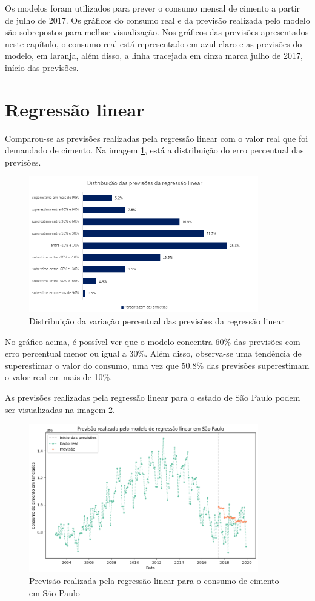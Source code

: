 Os modelos foram utilizados para prever o consumo mensal de 
cimento a partir de julho de 2017. Os gráficos do consumo real 
e da previsão realizada pelo modelo são sobrepostos para melhor
visualização. Nos gráficos das previsões apresentados neste 
capítulo, o consumo real está representado em azul claro e 
as previsões do modelo, em laranja, além disso, a linha 
tracejada em cinza marca julho de 2017, início das previsões.

\section{Regressão linear}

Comparou-se as previsões realizadas pela regressão linear com o valor real 
que foi demandado de cimento. Na imagem \ref{img:erro-perc-rg}, está a 
distribuição do erro percentual das previsões.

\begin{figure}[H]
    \centering
    \includegraphics[width=10cm]{../figuras/graficos/reg_lin/erro-perc-rg.png}
    \caption{Distribuição da variação percentual das previsões da regressão linear}
    \label{img:erro-perc-rg}
\end{figure}

No gráfico acima, é possível ver que o modelo concentra 60\% das previsões 
com erro percentual menor ou igual a 30\%. Além disso, observa-se uma 
tendência de superestimar o valor do consumo, uma vez que 50.8\% das previsões
superestimam o valor real em mais de 10\%. 

As previsões realizadas pela regressão linear para o estado 
de São Paulo podem ser visualizadas na imagem \ref{prev-sp-rg}.

\begin{figure}[H]
    \centering
    \includegraphics[width=10cm]{../figuras/graficos/reg_lin/prev_sp.png}
    \caption{Previsão realizada pela regressão linear para o 
    consumo de cimento em São Paulo}
    \label{prev-sp-rg}
\end{figure}

